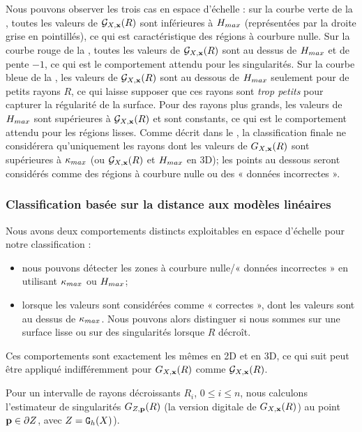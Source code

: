 Nous pouvons observer les trois cas en espace d'échelle : sur la courbe verte de
la , toutes les valeurs de $\mathcal{G}_{X,\mathbf{x}}(R)$
sont inférieures à $H_{max}$ (représentées par la droite grise en
pointillés), ce qui est caractéristique des régions à courbure nulle. Sur la
courbe rouge de la , toutes les valeurs
de $\mathcal{G}_{X,\mathbf{x}}(R)$ sont au dessus de $H_{max}$ et de pente $-1$, ce qui est le
comportement attendu pour les singularités. Sur la courbe bleue de la
, les valeurs de $\mathcal{G}_{X,\mathbf{x}}(R)$ sont au
dessous de $H_{max}$ seulement pour de petits rayons $R$, ce qui laisse
supposer que ces rayons sont \emph{trop petits} pour capturer la régularité de
la surface. Pour des rayons plus grands, les valeurs de $H_{max}$ sont
supérieures à $\mathcal{G}_{X,\mathbf{x}}(R)$ et sont constants, ce qui est le comportement attendu
pour les régions lisses. Comme décrit dans le
, la classification
finale ne considérera qu'uniquement les rayons dont les valeurs de $G_{X,\mathbf{x}}(R)$
sont supérieures à $\kappa_{max}$ (ou $\mathcal{G}_{X,\mathbf{x}}(R)$ et $H_{max}$ en 3D); les
points au dessous seront considérés comme des régions à courbure nulle ou des «
données incorrectes ».
%
\subsubsection{Classification basée sur la distance aux modèles linéaires}%
\label{sec:applications:feature:II:classification}
%
Nous avons deux comportements distincts exploitables en espace d'échelle pour
notre classification :
%
\begin{itemize}
   \item nous pouvons détecter les zones à courbure nulle/« données incorrectes » en
         utilisant $\kappa_{max}$ ou $H_{max}$;
   \item lorsque les valeurs sont considérées comme « correctes », \cad dont les valeurs sont au dessus de
         $\kappa_{max}$. Nous pouvons alors distinguer si nous sommes sur une surface
         lisse ou sur des singularités lorsque $R$ décroît.
\end{itemize}
%
Ces comportements sont exactement les mêmes en 2D et en 3D, ce qui suit peut
être appliqué indifféremment pour $G_{X,\mathbf{x}}(R)$ comme $\mathcal{G}_{X,\mathbf{x}}(R)$.


Pour un intervalle de rayons décroissants $R_i$, $0 \leq i \leq n$, nous
calculons l'estimateur de singularités $G_{Z,\mathbf{p}}(R)$ (la version
digitale de $G_{X,\mathbf{x}}(R)$) au point $\mathbf{p} \in \partial Z$, avec $Z = \mathtt{G}_{h}(X)$).


